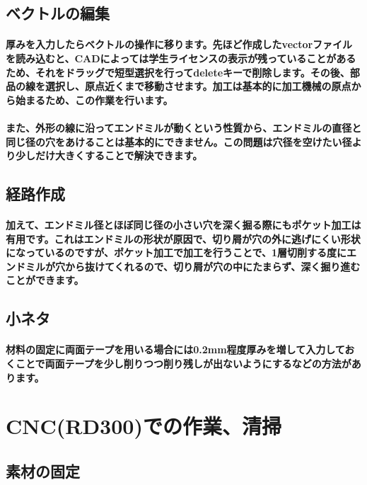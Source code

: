 \documentclass[b5paper, 9pt, twocolumn, titlepage,openany]{jsbook}%
\begin{document}
\subsection{ベクトルの編集}
\paragraph{厚みを入力したらベクトルの操作に移ります。先ほど作成したvectorファイルを読み込むと、CADによっては学生ライセンスの表示が残っていることがあるため、それをドラッグで短型選択を行ってdeleteキーで削除します。その後、部品の線を選択し、原点近くまで移動させます。加工は基本的に加工機械の原点から始まるため、この作業を行います。}
\paragraph{また、外形の線に沿ってエンドミルが動くという性質から、エンドミルの直径と同じ径の穴をあけることは基本的にできません。この問題は穴径を空けたい径より少しだけ大きくすることで解決できます。}
\subsection{経路作成}
\paragraph{加えて、エンドミル径とほぼ同じ径の小さい穴を深く掘る際にもポケット加工は有用です。これはエンドミルの形状が原因で、切り屑が穴の外に逃げにくい形状になっているのですが、ポケット加工で加工を行うことで、1層切削する度にエンドミルが穴から抜けてくれるので、切り屑が穴の中にたまらず、深く掘り進むことができます。}
\subsection{小ネタ}
\paragraph{材料の固定に両面テープを用いる場合には0.2mm程度厚みを増して入力しておくことで両面テープを少し削りつつ削り残しが出ないようにするなどの方法があります。}

\section{CNC(RD300)での作業、清掃}
\subsection{素材の固定}
\end{document}
